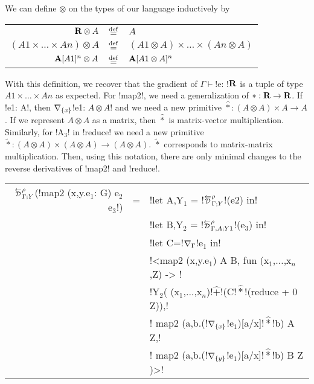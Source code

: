 We can define $\otimes$ on the types of our language inductively by

\begin{tabular}{r c l}
    $\mathbf{R} \otimes A$ & $\stackrel {\mathrm{def}}=$ & $A$ \\
    $(A1 \times \ldots \times An)\otimes A$ & $\stackrel {\mathrm{def}}=$ & $(A1\otimes A) \times \ldots \times (An \otimes A)$ \\
    $\mathbf{A}[A1]^{n} \otimes A$ & $\stackrel {\mathrm{def}}=$ & $\mathbf{A}[A1\otimes A]^{n}$
\end{tabular}

With this definition, we recover that the gradient of $\Gamma \vdash$!e: !$\mathbf{R}$ is a tuple of type $A1\times\ldots\times An$ as expected.
For !map2!, we need a generalization of $*:\mathbf{R}\to\mathbf{R}$. 
If !e1: A!, then $\nabla_{\{x\}}$!e1: $A\otimes A$! and we need a new primitive $\widehat{*}:(A\otimes A) \times A \to A$.
If we represent $A\otimes A$ as a matrix, then $\widehat{*}$ is matrix-vector multiplication.
Similarly, for !A$_{3}$! in !reduce! we need a new primitive $\widetilde{*}:(A\otimes A)\times(A\otimes A) \to (A\otimes A)$.
$\widetilde{*}$ corresponds to matrix-matrix multiplication.
Then, using this notation, there are only minimal changes to the reverse derivatives of !map2! and !reduce!.

\begin{center}
\begin{tabular}{r c l}
    $\directD{\rho}{\Gamma}{Y}$(!map2 (x,y.e$_1$: G) e$_2$ e$_3$!) &=&  
    !let A,Y$_1$ = !$\directD{\rho}{\Gamma}{Y}$!(e2) in! \\
    && !let B,Y$_2$ = !$\directD{\rho}{\Gamma,A}{Y1}$!(e$_3$) in! \\
    && !let C=!$\nabla_{\Gamma}$!e$_1$ in!\\
    && !<map2 (x,y.e$_1$) A B, fun (x$_1$,$\ldots$,x$_n$,Z) -> !\\
    && !Y$_2$( (x$_1$,$\ldots$,x$_n$)!$\widehat{+}$!(C!$\widehat{*}$!(reduce + 0 Z)),!\\
    && \quad\quad! map2 (a,b.(!$\nabla_{\{x\}}$!e$_1$)[a/x]!$\widehat{*}$!b) A Z,!\\
    && \quad\quad! map2 (a,b.(!$\nabla_{\{y\}}$!e$_1$)[a/x]!$\widehat{*}$!b) B Z )>!\\
    \end{tabular}
    \end{center}

